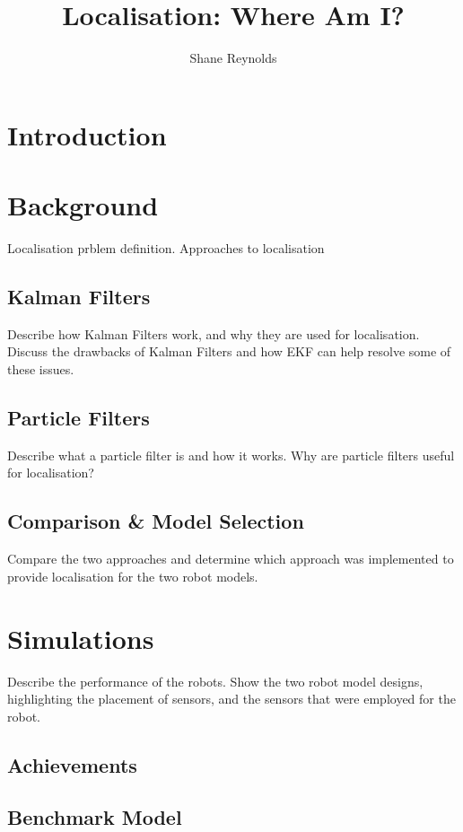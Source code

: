 \documentclass[a4paper]{article}
\begin{document}
\title{Localisation: Where Am I?}
\author{Shane Reynolds}
\maketitle
\tableofcontents
\newpage
\section{Introduction}


\section{Background}
Localisation prblem definition. Approaches to localisation

\subsection{Kalman Filters}
Describe how Kalman Filters work, and why they are used for localisation. Discuss the drawbacks of Kalman Filters and how EKF can help resolve some of these issues.

\subsection{Particle Filters}
Describe what a particle filter is and how it works. Why are particle filters useful for localisation?

\subsection{Comparison \& Model Selection}
Compare the two approaches and determine which approach was implemented to provide localisation for the two robot models.

\section{Simulations}
Describe the performance of the robots. Show the two robot model designs, highlighting the placement of sensors, and the sensors that were employed for the robot.

\subsection{Achievements}

\subsection{Benchmark Model}
\end{document}
